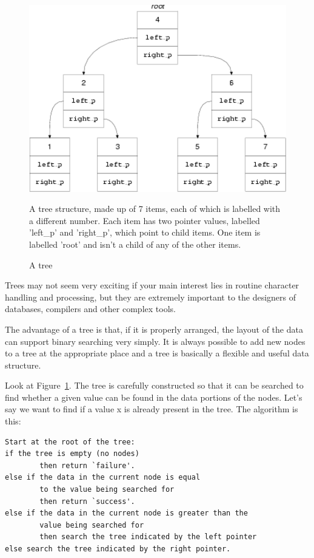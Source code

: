     \begin{figure}[htb]\centering
      \includegraphics[type=pdf,read=.pdf,ext=.pdf,scale=0.8]
      {figure/6.3_tree}
      \caption*{A tree structure, made up of 7 items,
        each of which is labelled with a different number.
        Each item has two pointer values, labelled 'left\_p' and 'right\_p',
        which point to child items.
        One item is labelled 'root'
        and isn't a child of any of the other  items.}
      \caption{\label{fig:tree}A tree}
    \end{figure}



   Trees may not seem very exciting if your main interest lies in routine
    character handling and processing, but they are extremely important to the
    designers of databases, compilers and other complex tools.


   The advantage of a tree is that, if it is properly arranged, the layout
    of the data can support binary searching very simply. It is always possible
    to add new nodes to a tree at the appropriate place and a tree is basically
    a flexible and useful data structure.


   Look at Figure~\ref{fig:tree}. The tree is carefully constructed so
    that it can be searched to find whether a given value can be found in the
    data portions of the nodes. Let's say we want to find if a value
    x is already present in the tree. The algorithm is this:


   \begin{Verbatim}
Start at the root of the tree:
if the tree is empty (no nodes)
        then return `failure'.
else if the data in the current node is equal
        to the value being searched for
        then return `success'.
else if the data in the current node is greater than the
        value being searched for
        then search the tree indicated by the left pointer
else search the tree indicated by the right pointer.
\end{Verbatim}

